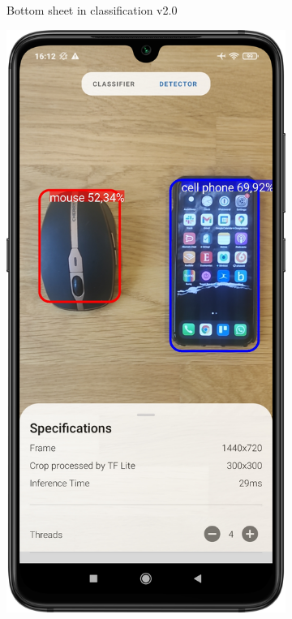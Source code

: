 \documentclass[
			   fontsize=11pt,
               paper=a4,
               bibliography=totoc,
               idxtotoc,
               headsepline,
               footsepline,
               footinclude=false,
               BCOR=12mm,
               DIV=13,
               openany,   %
               ]
               {scrbook}
\begin{document}
\begin{figure}[H]
\begin{subfigure}{.23\textwidth}
		\caption[Screenshots of the new app in version 2.0 showing the classification activity with its bottom sheet expanded]{Bottom sheet in classification v2.0}
		\label{fig:appImage22}
	\end{subfigure} 
	\hfil
	\begin{subfigure}{.23\textwidth}
		\centering
		\includegraphics[width=\linewidth]{figures/app_detection_sheet_new.png}

\end{subfigure}
\end{figure}
\end{document}
